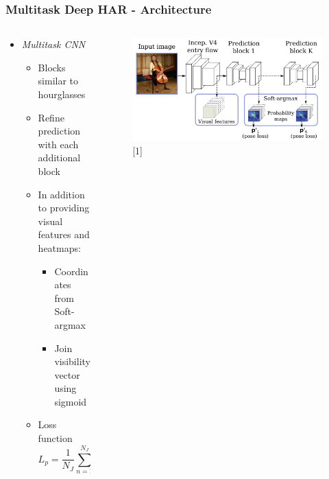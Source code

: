 \documentclass[9pt]{beamer}
\providecommand{\sourcefix}[1]{\\ \footnotesize \tugreen{Source:} [#1]}
\newenvironment{myframe}[1][]{%
\begin{frame}%
\frametitle{#1}
\setcounter{footnote}{0}


}{%
\end{frame}%
}
\begin{document}
\begin{myframe}[Multitask Deep HAR - Architecture]


    \begin{columns}[T]
        \begin{column}{.45\textwidth}
            \begin{itemize}
                \item \textit{Multitask CNN}
                \begin{itemize}
                    \item Blocks similar to hourglasses
                    \item Refine prediction with each additional block
                    \item In addition to providing visual features and heatmaps:
                    \begin{itemize}
                        \item Coordinates from Soft-argmax
                        \item Join visibility vector using sigmoid
                    \end{itemize}
                    \item Loss function $$L_p = \frac{1}{N_J}\sum_{n=1}^{N_J}(~ \lvert\lvert \hat{p}_n - p_n \rvert\rvert_1 ~+~ \lvert\lvert \hat{p}_n - p_n \rvert\rvert^2_2 ~ )$$
                \end{itemize}
            \end{itemize}
        \end{column}
        \begin{column}{.45\textwidth}
            \begin{figure}
                \includegraphics[width=.99\textwidth]{multitask-part.png}
                \sourcefix{1}
            \end{figure}
        \end{column}
	\end{columns}
\end{myframe}
\end{document}
